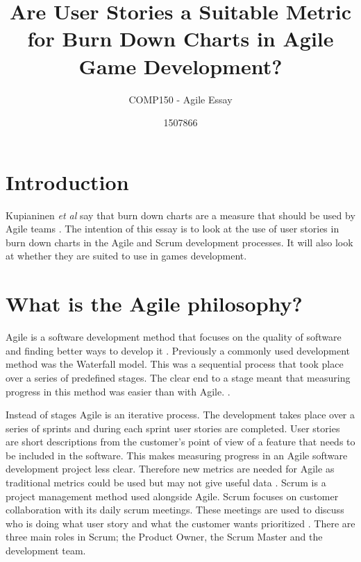 \documentclass{scrartcl}
\title{Are User Stories a Suitable Metric for Burn Down Charts in Agile Game Development?}
\subtitle{COMP150 - Agile Essay}
\author{1507866}
\begin{document}
	
\maketitle
	
	
\section{Introduction}

Kupianinen \textit{et al} say that burn down charts are a measure that should be used by Agile teams \cite{Kupiainen}. The intention of this essay is to look at the use of user stories in burn down charts in the Agile and Scrum development processes. It will also look at whether they are suited to use in games development.

\section{What is the Agile philosophy?}

Agile is a software development method that focuses on the quality of software and finding better ways to develop it \cite{AgileManifesto}. Previously a commonly used development method was the Waterfall model. This was a sequential process that took place over a series of predefined stages. The clear end to a stage meant that measuring progress in this method was easier than with Agile. \cite{Duka}.

Instead of stages Agile is an iterative process. The development takes place over a series of sprints and during each sprint user stories are completed. User stories are short descriptions from the customer's point of view of a feature that needs to be included in the software. This makes measuring progress in an Agile software development project less clear. Therefore new metrics are needed for Agile as traditional metrics could be used but may not give useful data \cite{Misra}.
Scrum is a project management method used alongside Agile. Scrum focuses on customer collaboration with its daily scrum meetings. These meetings are used to discuss who is doing what user story and what the customer wants prioritized \cite{Sutherland}. There are three main roles in Scrum; the Product Owner, the Scrum Master and the development team. \cite{Ktata}
\end{document}
